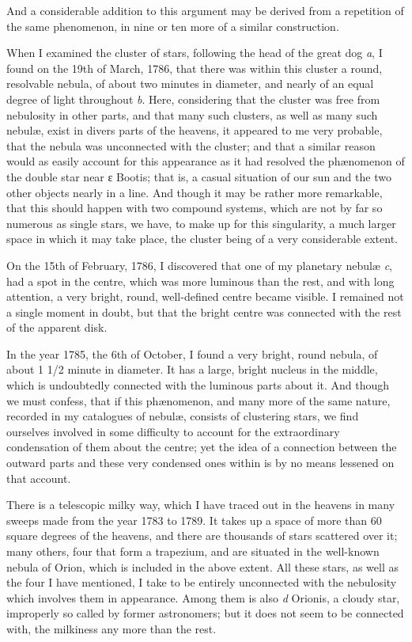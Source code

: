 \documentclass[a4paper, 12pt, oneside, polutonikogreek, english]{article}
\begin{document}
And a considerable addition to this argument may be derived from a repetition of the same phenomenon, in nine or ten more of a similar construction.

When I examined the cluster of stars, following the head of the great dog \emph{a}, I found on the 19th of March, 1786, that there was within this cluster a round, resolvable nebula, of about two minutes in diameter, and nearly of an equal degree of light throughout \emph{b}. Here, considering that the cluster was free from nebulosity in other parts, and that many such clusters, as well as many such nebulæ, exist in divers parts of the heavens, it appeared to me very probable, that the nebula was unconnected with the cluster; and that a similar reason would as easily account for this appearance as it had resolved the phænomenon of the double star near ε Bootis; that is, a casual situation of our sun and the two other objects nearly in a line. And though it may be rather more remarkable, that this should happen with two compound systems, which are not by far so numerous as single stars, we have, to make up for this singularity, a much larger space in which it may take place, the cluster being of a very considerable extent.

On the 15th of February, 1786, I discovered that one of my planetary nebulæ \emph{c}, had a spot in the centre, which was more luminous than the rest, and with long attention, a very bright, round, well-defined centre became visible. I remained not a single moment in doubt, but that the bright centre was connected with the rest of the apparent disk.

In the year 1785, the 6th of October, I found a very bright, round nebula, of about 1 1/2 minute in diameter. It has a large, bright nucleus in the middle, which is undoubtedly connected with the luminous parts about it. And though we must confess, that if this phænomenon, and many more of the same nature, recorded in my catalogues of nebulæ, consists of clustering stars, we find ourselves involved in some difficulty to account for the extraordinary condensation of them about the centre; yet the idea of a connection between the outward parts and these very condensed ones within is by no means lessened on that account.

There is a telescopic milky way, which I have traced out in the heavens in many sweeps made from the year 1783 to 1789. It takes up a space of more than 60 square degrees of the heavens, and there are thousands of stars scattered over it; many others, four that form a trapezium, and are situated in the well-known nebula of Orion, which is included in the above extent. All these stars, as well as the four I have mentioned, I take to be entirely unconnected with the nebulosity which involves them in appearance. Among them is also \emph{d} Orionis, a cloudy star, improperly so called by former astronomers; but it does not seem to be connected with, the milkiness any more than the rest.
\end{document}
